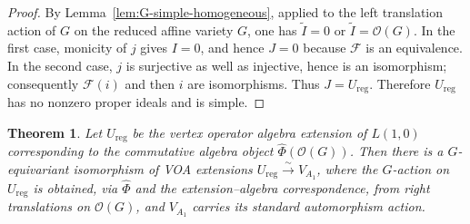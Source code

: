 \documentclass[10pt,a4paper]{amsart}
\numberwithin{equation}{section} \newtheorem{thm}{Theorem}[section] \newtheorem{lem}[thm]{Lemma} \newtheorem{ex}[thm]{Example} \newtheorem{prop}[thm]{Proposition} \newtheorem{cor}[thm]{Corollary} \newtheorem{defi}[thm]{Definition} \newtheorem{rmk}[thm]{Remark} \newtheorem{notation}[thm]{Notation}
\newcommand{\OO}{\mathcal O}
\begin{document}
\begin{proof}
By Lemma~\ref{lem:G-simple-homogeneous}, applied to the left translation action of $G$ on the reduced affine variety $G$, one has \(\widetilde I=0\) or \(\widetilde I=\OO(G)\). In the first case, monicity of $j$ gives $I=0$, and hence $J=0$ because $\mathcal F$ is an equivalence. In the second case, $j$ is surjective as well as injective, hence is an isomorphism; consequently $\mathcal F(i)$ and then $i$ are isomorphisms. Thus $J=U_{\mathrm{reg}}$. Therefore $U_{\mathrm{reg}}$ has no nonzero proper ideals and is simple.
\end{proof}

\begin{thm}\label{thm:regular-algebra}
Let $U_{\mathrm{reg}}$ be the vertex operator algebra extension of $L(1,0)$ corresponding to the commutative algebra object $\widehat\Phi(\OO(G))$. Then there is a $G$-equivariant isomorphism of VOA extensions \(U_{\mathrm{reg}}\overset\sim\longrightarrow V_{A_1}\), where the $G$-action on $U_{\mathrm{reg}}$ is obtained, via $\widehat\Phi$ and the extension--algebra correspondence, from right translations on $\OO(G)$, and $V_{A_1}$ carries its standard automorphism action.
\end{thm}
\end{document}
